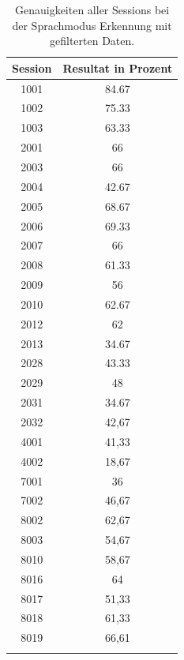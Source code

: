 \begin{table}[H]
 \centering
 \caption{Genauigkeiten aller Sessions bei der Sprachmodus Erkennung mit gefilterten Daten. }
\begin{tabular}{|c|c|}
\hline 
Session & Resultat in Prozent \\ 
\hline 
1001 & 84.67 \\ 
\hline 
1002 & 75.33\\ 
\hline 
1003 & 63.33 \\ 
\hline 
2001 & 66\\ 
\hline 
2003 & 66 \\ 
\hline 
2004 & 42.67 \\  
\hline 
2005 & 68.67 \\ 
\hline 
2006 & 69.33 \\
\hline 
2007 & 66 \\
\hline 
2008 & 61.33 \\
\hline 
2009 & 56 \\
\hline 
2010 & 62.67 \\
\hline 
2012 & 62 \\
\hline 
2013 & 34.67 \\
\hline 
2028 & 43.33 \\
\hline 
2029 & 48 \\
\hline 
2031 & 34.67 \\
\hline 
2032 & 42,67 \\
\hline 
4001 & 41,33 \\ 
\hline 
4002 & 18,67 \\ 
\hline 
7001 & 36 \\ 
\hline 
7002 & 46,67\\ 
\hline 
8002 & 62,67 \\ 
\hline 
8003 & 54,67 \\
\hline 
8010 & 58,67 \\
\hline 
8016 & 64 \\
\hline 
8017 & 51,33 \\
\hline 
8018 & 61,33 \\
\hline 
8019 & 66,61 \\ 
\hline   
\label{tab:FiltModeSessions} 
\end{tabular}
\end{table}
 
 
\clearpage
